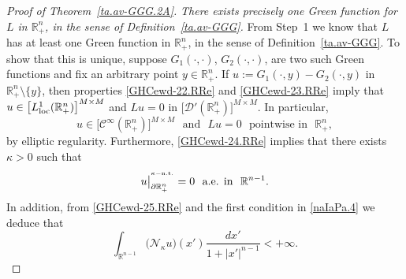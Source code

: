 \documentclass[11pt,reqno]{amsart}
\numberwithin{equation}{section}
\theoremstyle{remark}
\begin{document}
\begin{proof}[Proof of Theorem~\ref{ta.av-GGG.2A}]
\vskip 0.08in
 \textit{There exists precisely one Green 
function for $L$ in ${\mathbb{R}}^n_{+}$, in the sense of Definition~\ref{ta.av-GGG}.
}
\vskip 0.08in
From Step~1 we know that $L$ has at least one Green 
function in ${\mathbb{R}}^n_{+}$, in the sense of Definition~\ref{ta.av-GGG}. 
To show that this is unique, suppose $G_1(\cdot,\cdot)$, $G_2(\cdot,\cdot)$, are two such
Green functions and fix an arbitrary point $y\in{\mathbb{R}}^n_{+}$.
If $u:=G_1(\cdot,y)-G_2(\cdot,y)$ in ${\mathbb{R}}^n_{+}\setminus\{y\}$, then 
properties \eqref{GHCewd-22.RRe} and \eqref{GHCewd-23.RRe} imply that 
$u\in\big[L^1_{\rm loc}({\mathbb{R}}^n_{+})\big]^{M\times M}$ and $Lu=0$ in 
$\big[{\mathcal{D}}'({\mathbb{R}}^n_{+})\big]^{M\times M}$. In particular, 
%
\begin{equation}\label{naIaPa.4}
u\in\big[{\mathscr{C}}^\infty({\mathbb{R}}^n_{+})\big]^{M\times M}
\,\,\text{ and }\,\,Lu=0\,\,\text{ pointwise in }\,\,{\mathbb{R}}^n_{+},
\end{equation}
%
by elliptic regularity. Furthermore, \eqref{GHCewd-24.RRe} implies that there exists $\kappa>0$ such that 
%
\begin{equation}\label{naIaPa.5}
u\big|^{{}^{\kappa-{\rm n.t.}}}_{\partial{\mathbb{R}}^n_{+}}=0\,\,\text{ a.e. in }\,\,{\mathbb{R}}^{n-1}.
\end{equation}
%
In addition, from \eqref{GHCewd-25.RRe} and the first condition in \eqref{naIaPa.4} we deduce that  
%
\begin{equation}\label{GHReRFv.BNv}
\int_{{\mathbb{R}}^{n-1}}\big({\mathcal{N}}_{\kappa}u\big)(x')\frac{dx'}{1+|x'|^{n-1}}<+\infty.
\end{equation}


\end{proof}
\end{document}
